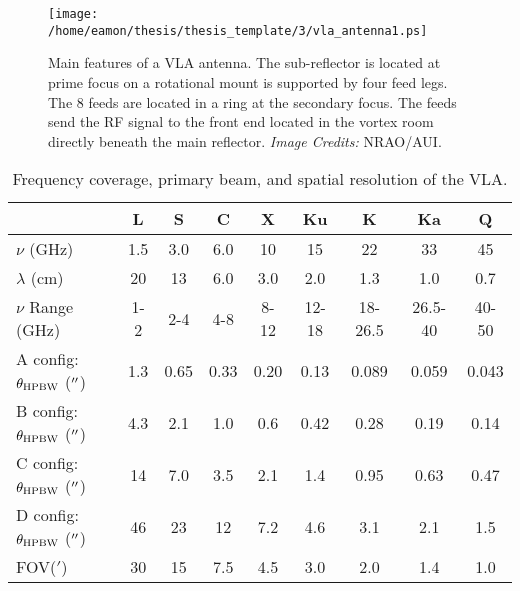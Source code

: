 \begin{figure}[hbt!]
\centering 
          \texttt{[image: /home/eamon/thesis/thesis\_template/3/vla\_antenna1.ps]}
\caption[Main features of a VLA antenna.]{Main features of a VLA antenna. The sub-reflector is located at prime focus on a rotational mount is supported by four feed legs. The 8 feeds are located in a ring at the secondary focus. The feeds send the RF signal to the front end located in the vortex room directly beneath the main reflector. \textit{Image Credits:} NRAO/AUI.}
\label{fig:3.5}
\end{figure}

\begin{table}
\begin{center}
\caption[Frequency coverage, primary beam, and spatial resolution of the VLA.]
{Frequency coverage, primary beam, and spatial resolution of the VLA.}
\begin{tabular}{lcccccccc}
\hline
\hline
\rule{0pt}{2.5ex} &  L& S&C&X&Ku&K&Ka&Q\\
\hline
\rule{0pt}{2.5ex}$\nu$ (GHz)& 1.5& 3.0&6.0&10&15&22&33&45\\
$\lambda$ (cm)& 20& 13&6.0&3.0&2.0&1.3&1.0&0.7\\
$\nu$ Range (GHz)& 1-2& 2-4&4-8&8-12&12-18&18-26.5&26.5-40&40-50\\
A config: $\theta_{\rm{HPBW}}$ ($^{\prime\prime}$)&  1.3& 0.65&0.33&0.20&0.13&0.089&0.059&0.043\\
B config: $\theta_{\rm{HPBW}}$ ($^{\prime\prime}$)&  4.3& 2.1&1.0&0.6&0.42&0.28&0.19&0.14\\
C config: $\theta_{\rm{HPBW}}$ ($^{\prime\prime}$)&  14& 7.0&3.5&2.1&1.4&0.95&0.63&0.47\\
D config: $\theta_{\rm{HPBW}}$ ($^{\prime\prime}$)&  46& 23&12&7.2&4.6&3.1&2.1&1.5\\
FOV($'$)& 30& 15&7.5 &4.5 &3.0&2.0&1.4&1.0\\
\hline
\end{tabular}
\label{tab:3.6}
\end{center}
\end{table}
